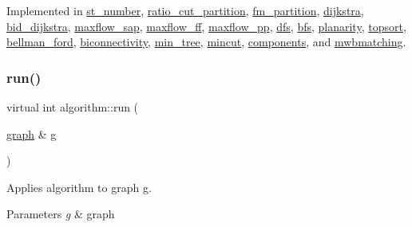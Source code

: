 Implemented in \mbox{\hyperlink{classst__number_ae6f86706b8ae3495d3794b8c684fff0f}{st\+\_\+number}}, \mbox{\hyperlink{classratio__cut__partition_ad017eaf98f9ae4ca9dbe6b3eda9fc94d}{ratio\+\_\+cut\+\_\+partition}}, \mbox{\hyperlink{classfm__partition_a6db2eeb6ae968dbab78302f0448c0ced}{fm\+\_\+partition}}, \mbox{\hyperlink{classdijkstra_a444c288b3a49ec1c2973459dad55ffb3}{dijkstra}}, \mbox{\hyperlink{classbid__dijkstra_a6df2769941bc73fc5626b084745a2258}{bid\+\_\+dijkstra}}, \mbox{\hyperlink{classmaxflow__sap_a14574d2f9ce31a3cdeb0888e57fc0616}{maxflow\+\_\+sap}}, \mbox{\hyperlink{classmaxflow__ff_a893e5136d4f7f1d4b67ef5b67306d17b}{maxflow\+\_\+ff}}, \mbox{\hyperlink{classmaxflow__pp_a2179764baf624f1414211f3a7181b1a0}{maxflow\+\_\+pp}}, \mbox{\hyperlink{classdfs_affaffda8be8418d6dbf396c5b1d6b81a}{dfs}}, \mbox{\hyperlink{classbfs_a6398bc230f9723cd5fdd32cd603647cc}{bfs}}, \mbox{\hyperlink{classplanarity_aca500e3d46a99c6231aff86afa2a71b1}{planarity}}, \mbox{\hyperlink{classtopsort_aa3d9ccc7c632dac6b7303e9828c14f62}{topsort}}, \mbox{\hyperlink{classbellman__ford_a7d28afa62ce8068c4d0f2d1f96136fd6}{bellman\+\_\+ford}}, \mbox{\hyperlink{classbiconnectivity_a4393dd1e626887472f6967722349abc6}{biconnectivity}}, \mbox{\hyperlink{classmin__tree_a0edbe612424dc5f4de4701b8fd0df931}{min\+\_\+tree}}, \mbox{\hyperlink{classmincut_a3f2142246a7b3e7b19b15d62314c9337}{mincut}}, \mbox{\hyperlink{classcomponents_a07b6bab5962524ae26ccb478b35cd76c}{components}}, and \mbox{\hyperlink{classmwbmatching_acb2171f09442f1d4170eaed5dc213865}{mwbmatching}}.

\mbox{\label{classalgorithm_a734b189509a8d6b56b65f8ff772d43ca}} 
\subsubsection{\texorpdfstring{run()}{run()}}
{\footnotesize\ttfamily virtual int algorithm\+::run (\begin{DoxyParamCaption}\item[{\mbox{\hyperlink{classgraph}{graph}} \&}]{g }\end{DoxyParamCaption})\hspace{0.3cm}{\ttfamily [pure virtual]}}



Applies algorithm to graph g. 


\begin{DoxyParams}{Parameters}
{\em g} & graph \\
\hline
\end{DoxyParams}

